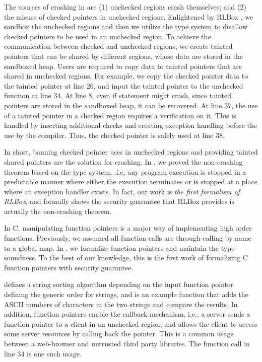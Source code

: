 The sources of crashing in \checkedc are (1) unchecked regions crash themselves;
  and (2) the misuse of checked pointers in unchecked regions.
Enlightened by RLBox \cite{rlbox-paper},
we sandbox the unchecked regions and then we utilize the \checkedc type system
to disallow checked pointers to be used in an unchecked region. 
To achieve the communication between checked and unchecked regions,
we create tainted pointers that can be shared by different regions,
whose data are stored in the sandboxed heap.
Users are required to copy data to tainted pointers that are shared in unchecked regions.
For example,  we copy the checked pointer data to the tainted pointer 
at  line 26,
and input the tainted pointer to the unchecked function at line 34.
At line 8, even if statement might crash, since tainted pointers are stored
in the sandboxed heap, it can be recovered.
At line 37, the use of a tainted pointer in a checked region
requires a verification on it.
This is handled by inserting additional checks
and creating exception handling before the use by the \systemname compiler.
Thus, the checked pointer  is safely used at line 38.

In short, banning checked pointer uses in unchecked regions and providing tainted shared pointers
are the solution for crashing. 
In \systemname, we proved the non-crashing theorem based on the \systemname type system,
.i.e, any program execution is stopped in a predictable manner
where either the execution terminates or is stopped at a place where an exception handler exists.
In fact, our work is \textit{the first formalism of RLBox},
and formally shows the security guarantee that RLBox provides 
is actually the non-crashing theorem.

In C, manipulating function pointers is a major way of implementing high order functions.
Previously, we assumed all function calls are through calling by name to a global map.
In \systemname, we formalize function pointers and maintain the \systemname type soundness.
To the best of our knowledge,
this is the first work of formalizing C function pointers with security guarantee.

 defines a string sorting algorithm
depending on the input function pointer  defining the generic order for strings,
and  is an example  function
that adds the ASCII numbers of characters in the two strings and compare the results.
In addition, function pointers enable the callback mechanism,
i.e., a server sends a function pointer to a client in an unchecked region,
and allows the client to access some server resources by calling back the pointer.
This is a common usage between a web-browser and untrusted third party libraries.
The function call in  line 34 is one such usage.

